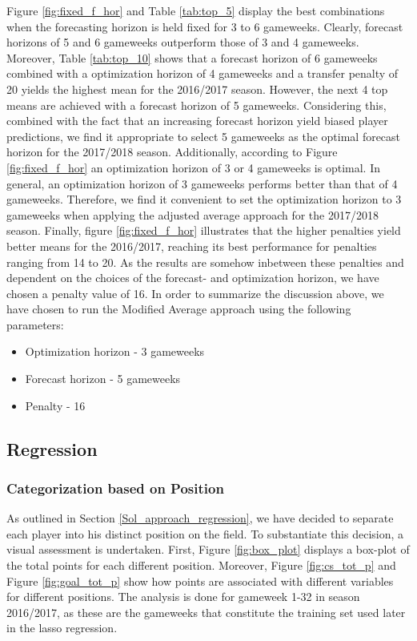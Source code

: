 Figure \ref{fig:fixed_f_hor} and Table \ref{tab:top_5} display the best combinations when the forecasting horizon is held fixed for 3 to 6 gameweeks. Clearly, forecast horizons of 5 and 6 gameweeks outperform those of 3 and 4 gameweeks. Moreover, Table \ref{tab:top_10} shows that a forecast horizon of 6 gameweeks combined with a optimization horizon of 4 gameweeks and a transfer penalty of 20 yields the highest mean for the 2016/2017 season. However, the next 4 top means are achieved with a forecast horizon of 5 gameweeks. Considering this, combined with the fact that an increasing forecast horizon yield biased player predictions, we find it appropriate to select 5 gameweeks as the optimal forecast horizon for the 2017/2018 season. Additionally, according to Figure \ref{fig:fixed_f_hor} an optimization horizon of 3 or 4 gameweeks is optimal. In general, an optimization horizon of 3 gameweeks performs better than that of 4 gameweeks. Therefore, we find it convenient to set the optimization horizon to 3 gameweeks when applying the adjusted average approach for the 2017/2018 season.
Finally, figure \ref{fig:fixed_f_hor} illustrates that the higher penalties yield better means for the 2016/2017, reaching its best performance for penalties ranging from 14 to 20. 
\newpar
As the results are somehow inbetween these penalties and dependent on the choices of the forecast- and optimization horizon, we have chosen a penalty value of 16. 
\newpar
In order to summarize the discussion above, we have chosen to run the Modified Average approach using the following parameters:
\begin{itemize}
    \item Optimization horizon - 3 gameweeks
    \item Forecast horizon - 5 gameweeks
    \item Penalty - 16
\end{itemize}

\subsection{Regression}\label{exp_setup_reg}

\subsubsection{Categorization based on Position}

As outlined in Section \ref{Sol_approach_regression}, we have decided to separate each player into his distinct position on the field. To substantiate this decision, a visual assessment is undertaken. First, Figure \ref{fig:box_plot} displays a box-plot of the total points for each different position. Moreover, Figure \ref{fig:cs_tot_p} and Figure \ref{fig:goal_tot_p} show how points are associated with different variables for different positions. The analysis is done for gameweek 1-32 in season 2016/2017, as these are the gameweeks that constitute the training set used later in the lasso regression.

